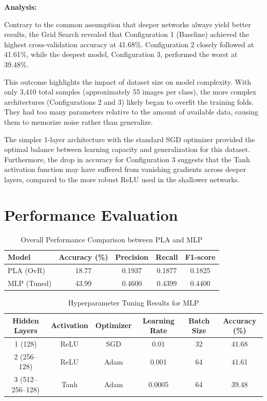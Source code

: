 \documentclass[11pt]{article}
\begin{document}
\textbf{Analysis:}

Contrary to the common assumption that deeper networks always yield better results, the Grid Search revealed that Configuration 1 (Baseline) achieved the highest cross-validation accuracy at 41.68\%. Configuration 2 closely followed at 41.61\%, while the deepest model, Configuration 3, performed the worst at 39.48\%.

This outcome highlights the impact of dataset size on model complexity. With only 3,410 total samples (approximately 55 images per class), the more complex architectures (Configurations 2 and 3) likely began to overfit the training folds. They had too many parameters relative to the amount of available data, causing them to memorize noise rather than generalize.

The simpler 1-layer architecture with the standard SGD optimizer provided the optimal balance between learning capacity and generalization for this dataset. Furthermore, the drop in accuracy for Configuration 3 suggests that the Tanh activation function may have suffered from vanishing gradients across deeper layers, compared to the more robust ReLU used in the shallower networks.
\section*{Performance Evaluation}

\begin{table}[H]
\centering
\caption{Overall Performance Comparison between PLA and MLP}
\renewcommand{\arraystretch}{1.3}
\begin{tabular}{lcccc}
\toprule
\textbf{Model} & \textbf{Accuracy (\%)} & \textbf{Precision} & \textbf{Recall} & \textbf{F1-score} \\
\midrule
PLA (OvR) & 18.77 & 0.1937 & 0.1877 & 0.1825 \\
MLP (Tuned) & 43.99 & 0.4600 & 0.4399 & 0.4400 \\
\bottomrule
\end{tabular}
\end{table}

\begin{table}[H]
\centering
\caption{Hyperparameter Tuning Results for MLP}
\renewcommand{\arraystretch}{1.3}
\begin{tabular}{cccccc}
\toprule
\textbf{Hidden Layers} & \textbf{Activation} & \textbf{Optimizer} & \textbf{Learning Rate} & \textbf{Batch Size} & \textbf{Accuracy (\%)} \\
\midrule
1 (128) & ReLU & SGD & 0.01 & 32 & 41.68 \\
2 (256--128) & ReLU & Adam & 0.001 & 64 & 41.61 \\
3 (512--256--128) & Tanh & Adam & 0.0005 & 64 & 39.48 \\
\bottomrule
\end{tabular}
\end{table}
\end{document}

